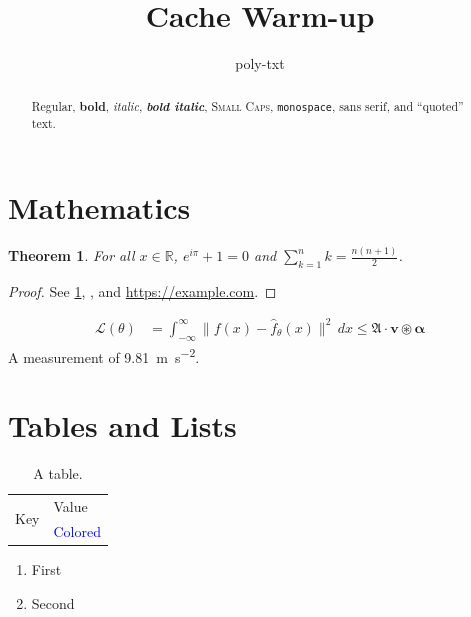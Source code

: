 \documentclass[11pt]{article}
\title{Cache Warm-up}
\author{poly-txt}
\date{}
\newtheorem{theorem}{Theorem}
\begin{document}
\maketitle

\begin{abstract}
Regular, \textbf{bold}, \textit{italic}, \textbf{\textit{bold italic}}, \textsc{Small Caps},
\texttt{monospace}, \textsf{sans serif}, and \enquote{quoted} text.
\end{abstract}

\section{Mathematics}\label{sec:math}
\begin{theorem}
For all $x \in \mathbb{R}$, $e^{i\pi} + 1 = 0$ and $\sum_{k=1}^{n} k = \frac{n(n+1)}{2}$.
\end{theorem}
\begin{proof}
See \cref{sec:math}, \cite{knuth}, and \url{https://example.com}.
\end{proof}
\begin{align}
  \mathcal{L}(\theta) &= \int_{-\infty}^{\infty} \lVert f(x) - \hat{f}_\theta(x) \rVert^2 \, dx
  \leq \mathfrak{A} \cdot \mathbf{v} \circledast \boldsymbol{\alpha}
\end{align}
A measurement of \SI{9.81}{\metre\per\second\squared}.

\section{Tables and Lists}
\begin{table}[H]
  \centering
  \begin{tabularx}{0.6\textwidth}{lX}
    \toprule
    \multirow{2}{*}{Key} & Value \\
    & \textcolor{blue}{Colored} \\
    \bottomrule
  \end{tabularx}
  \caption{A table.}
\end{table}
\begin{enumerate}[label=(\alph*)]
  \item First
  \item Second
\end{enumerate}
\end{document}
